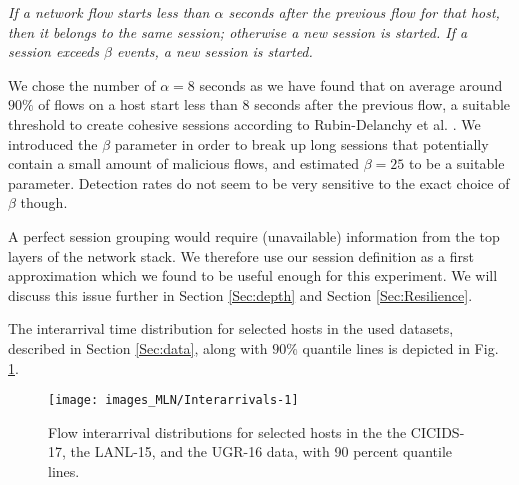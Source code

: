 \textit{If a network flow starts less than $\alpha$ seconds after the previous flow for that host, then it belongs to the same session; otherwise a new session is started. If a session exceeds $\beta$ events, a new session is started.}


 
We chose the number of $\alpha=8$ seconds as we have found that on average around $90\%$ of flows on a host start less than $8$ seconds after the previous flow, a suitable threshold to create cohesive sessions according to Rubin-Delanchy et al. \cite{rubin2014three}. We introduced the $\beta$ parameter in order to break up long sessions that potentially contain a small amount of malicious flows, and estimated $\beta=25$ to be a suitable parameter. Detection rates do not seem to be very sensitive to the exact choice of $\beta$ though.

A perfect session grouping would require (unavailable) information from the top layers of the network stack. We therefore use our session definition as  a first approximation which we found to be useful enough for this experiment. We will discuss this issue further in Section \ref{Sec:depth} and Section \ref{Sec:Resilience}.


The interarrival time distribution for selected hosts in the used datasets, described in Section \ref{Sec:data}, along with $90\%$ quantile lines is depicted in Fig. \ref{fig:Interarrivals}.

\begin{figure}
\centering
\texttt{[image: images\_MLN/Interarrivals-1]}
 \caption[Flow interarrival distributions for selected hosts in the the CICIDS-17, the LANL-15, and the UGR-16 data, with 90 percent quantile lines]{Flow interarrival distributions for selected hosts in the the CICIDS-17, the LANL-15, and the UGR-16 data, with 90 percent quantile lines.}\label{fig:Interarrivals}
\end{figure}


